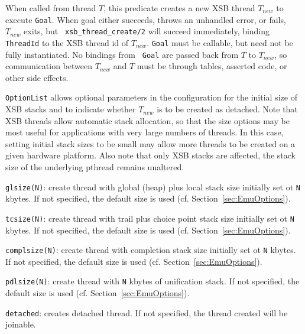 \begin{description}

%
When called from thread $T$, this predicate creates a new XSB thread
$T_{new}$ to execute {\tt Goal}.  When goal either succeeds, throws an
unhandled error, or fails, $T_{new}$ exits, but {\tt
  xsb\_thread\_create/2} will succeed immediately, binding {\tt
  ThreadId} to the XSB thread id of $T_{new}$.  {\tt Goal} must be
callable, but need not be fully instantiated.  No bindings from {\tt
  Goal} are passed back from $T$ to $T_{new}$, so communication
between $T_{new}$ and $T$ must be through tables, asserted code, or
other side effects.

{\tt OptionList} allows optional parameters in the configuration for
the initial size of XSB stacks and to indicate whether $T_{new}$ is to
be created as detached.  Note that XSB threads allow automatic stack
allocation, so that the size options may be most useful for
applications with very large numbers of threads.  In this case,
setting initial stack sizes to be small may allow more threads to be
created on a given hardware platform.  Also note that only XSB stacks
are affected, the stack size of the underlying pthread remains
unaltered.
%
\bi
\item {\tt glsize(N)}: create thread with global (heap) plus local
  stack size initially set ot {\tt N} kbytes.  If not specified, the
  default size is used (cf. Section~\ref{sec:EmuOptions}).
%
\item {\tt tcsize(N)}: create thread with trail plus choice point 
  stack size initially set ot {\tt N} kbytes.  If not specified, the
  default size is used (cf. Section~\ref{sec:EmuOptions}).
%
\item {\tt complsize(N)}: create thread with completion
  stack size initially set ot {\tt N} kbytes. If not specified, the
  default size is used (cf. Section~\ref{sec:EmuOptions}).
%
\item {\tt pdlsize(N)}: create thread with {\tt N} kbytes of
  unification stack.  If not specified, the
  default size is used (cf. Section~\ref{sec:EmuOptions}).
%
\item {\tt detached}: creates detached thread.  If not specified, the
  thread created will be joinable.
\ei


\end{description}
